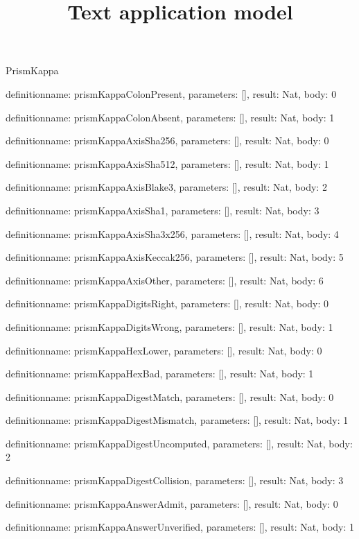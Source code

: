 \begin{lexlean}{PrismKappa}
\title{Text application model}
\begin{semanticmodule}
definition{name: prismKappaColonPresent, parameters: [], result: Nat, body: 0}

definition{name: prismKappaColonAbsent, parameters: [], result: Nat, body: 1}

definition{name: prismKappaAxisSha256, parameters: [], result: Nat, body: 0}

definition{name: prismKappaAxisSha512, parameters: [], result: Nat, body: 1}

definition{name: prismKappaAxisBlake3, parameters: [], result: Nat, body: 2}

definition{name: prismKappaAxisSha1, parameters: [], result: Nat, body: 3}

definition{name: prismKappaAxisSha3x256, parameters: [], result: Nat, body: 4}

definition{name: prismKappaAxisKeccak256, parameters: [], result: Nat, body: 5}

definition{name: prismKappaAxisOther, parameters: [], result: Nat, body: 6}

definition{name: prismKappaDigitsRight, parameters: [], result: Nat, body: 0}

definition{name: prismKappaDigitsWrong, parameters: [], result: Nat, body: 1}

definition{name: prismKappaHexLower, parameters: [], result: Nat, body: 0}

definition{name: prismKappaHexBad, parameters: [], result: Nat, body: 1}

definition{name: prismKappaDigestMatch, parameters: [], result: Nat, body: 0}

definition{name: prismKappaDigestMismatch, parameters: [], result: Nat, body: 1}

definition{name: prismKappaDigestUncomputed, parameters: [], result: Nat, body: 2}

definition{name: prismKappaDigestCollision, parameters: [], result: Nat, body: 3}

definition{name: prismKappaAnswerAdmit, parameters: [], result: Nat, body: 0}

definition{name: prismKappaAnswerUnverified, parameters: [], result: Nat, body: 1}


\end{semanticmodule}
\end{lexlean}
